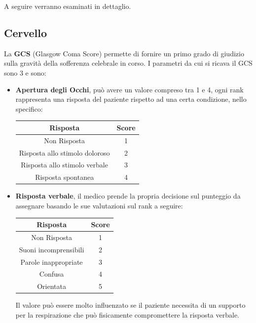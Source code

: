 A seguire verranno esaminati in dettaglio.

\subsection{Cervello}

La \textbf{GCS} (Glasgow Coma Score) permette di fornire un primo grado di giudizio sulla gravità della sofferenza celebrale in corso. 
I parametri da cui si ricava il GCS sono 3 e sono:
\begin{itemize}
	 \parsep
	\item \textbf{Apertura degli Occhi}, può avere un valore compreso tra 1 e 4, ogni rank rappresenta una risposta del paziente rispetto ad una certa condizione, nello specifico:
	
	\begin{center}
		\begin{tabular}{|c|c|}
		 \hline
		 \textbf{Risposta}&\textbf{Score}\\
		 \hline
		  Non Risposta & 1 \\
		  \hline
		  Risposta allo stimolo doloroso & 2 \\
		  \hline
		  Risposta allo stimolo verbale & 3 \\
		  \hline
		  Risposta spontanea & 4 \\
		  \hline		 
		\end{tabular}
	\end{center}

	\item \textbf{Risposta verbale}, il medico prende la propria decisione sul punteggio da assegnare basando le sue valutazioni sul rank a seguire:
	
		\begin{center}
		\begin{tabular}{|c|c|}
			\hline
			\textbf{Risposta}&\textbf{Score}\\
			\hline
			Non Risposta & 1 \\
			\hline
			Suoni incomprensibili & 2 \\
			\hline
			Parole inappropriate & 3 \\
			\hline
			Confusa & 4 \\
			\hline	
			Orientata & 5\\
			\hline		 
		\end{tabular}
	\end{center}

	Il valore può essere molto influenzato se il paziente necessita di un supporto per la respirazione che può fisicamente compromettere la risposta verbale.
	

\end{itemize}

